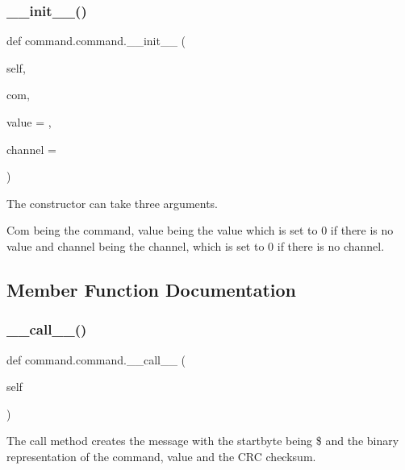 \subsubsection{\texorpdfstring{\+\_\+\+\_\+init\+\_\+\+\_\+()}{\_\_init\_\_()}}
{\footnotesize\ttfamily def command.\+command.\+\_\+\+\_\+init\+\_\+\+\_\+ (\begin{DoxyParamCaption}\item[{}]{self,  }\item[{}]{com,  }\item[{}]{value = {},  }\item[{}]{channel = {} }\end{DoxyParamCaption})}



The constructor can take three arguments. 

Com being the command, value being the value which is set to 0 if there is no value and channel being the channel, which is set to 0 if there is no channel. 

\subsection{Member Function Documentation}
\mbox{\label{classcommand_1_1command_ad1ad605342adbcf9a8554de183bec046}} 
\subsubsection{\texorpdfstring{\+\_\+\+\_\+call\+\_\+\+\_\+()}{\_\_call\_\_()}}
{\footnotesize\ttfamily def command.\+command.\+\_\+\+\_\+call\+\_\+\+\_\+ (\begin{DoxyParamCaption}\item[{}]{self }\end{DoxyParamCaption})}



The call method creates the message with the startbyte being \$ and the binary representation of the command, value and the C\+RC checksum. 

\mbox{\label{classcommand_1_1command_a66e801fbaee5caa92e17dd9faa15c0c2}} 
